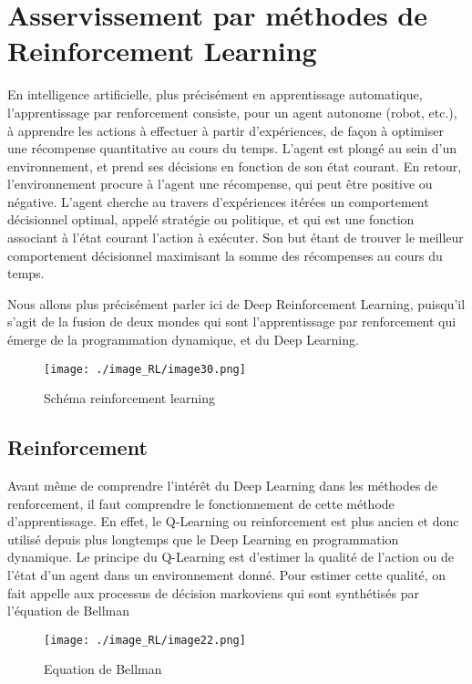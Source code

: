 \section{Asservissement par méthodes de Reinforcement Learning}

En intelligence artificielle, plus précisément en apprentissage automatique, l'apprentissage par renforcement consiste, pour un agent autonome (robot, etc.), à apprendre les actions à effectuer à partir d'expériences, de façon à optimiser une récompense quantitative au cours du temps. L'agent est plongé au sein d'un environnement, et prend ses décisions en fonction de son état courant. En retour, l'environnement procure à l'agent une récompense, qui peut être positive ou négative. L'agent cherche au travers d'expériences itérées un comportement décisionnel optimal, appelé stratégie ou politique, et qui est une fonction associant à l'état courant l'action à exécuter. Son but étant de trouver le meilleur comportement décisionnel maximisant la somme des récompenses au cours du temps.

Nous allons plus précisément parler ici de Deep Reinforcement Learning, puisqu’il s’agit de la fusion de deux mondes qui sont l’apprentissage par renforcement qui émerge de la programmation dynamique, et du Deep Learning.

\begin{figure}[H]
    \centering
    \texttt{[image: ./image\_RL/image30.png]}
    \caption{Schéma reinforcement learning}
\end{figure}

\subsection{Reinforcement}

Avant même de comprendre l’intérêt du Deep Learning dans les méthodes de renforcement, il faut comprendre le fonctionnement de cette méthode d’apprentissage. En effet, le Q-Learning ou reinforcement est plus ancien et donc utilisé depuis plus longtemps que le Deep Learning en programmation dynamique. Le principe du Q-Learning est  d’estimer la qualité de l’action ou de l’état d’un agent dans un environnement donné. Pour estimer cette qualité, on fait appelle aux processus de décision markoviens qui sont synthétisés par l’équation de Bellman

\begin{figure}[H]
    \centering
    \texttt{[image: ./image\_RL/image22.png]}
    \caption{Equation de Bellman}
\end{figure}

